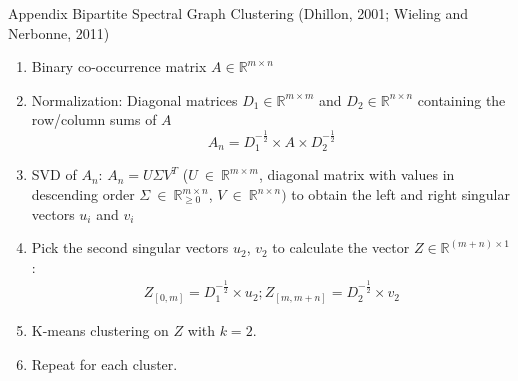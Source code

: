 \documentclass[xcolor={dvipsnames}]{beamer}
\newcommand{\R}{\mathds{R}}
\begin{document}
\begin{frame}{Appendix}
Bipartite Spectral Graph Clustering (Dhillon, 2001; Wieling and Nerbonne, 2011)

\begin{enumerate}
\item Binary co-occurrence matrix 
$A \in \R^{m \times n}$ 
\item Normalization: Diagonal matrices
$D_1  \in \R^{m \times m}$ and $D_2 \in \R^{n \times n}$ containing the row/column sums of $A$
    \begin{equation*}
A_n = D_1^{-\frac{1}{2}} \times A \times D_2^{-\frac{1}{2}}
\end{equation*}
\item
SVD of $A_n$: 
$A_n = U\Sigma{}V^T$
($U~\in~\R^{m \times m}$,
diagonal matrix with values in descending order
$\Sigma{}~\in~\R_{\geq 0}^{m \times n}$,
$V~\in~\R^{n \times n})$
to obtain the left and right singular vectors $u_i$ and $v_i$
\item Pick the second singular vectors $u_2$, $v_2$ to
calculate the vector $Z \in \R^{(m + n) \times 1}$:
\begin{align*}
Z_{[0, m]} = D_1^{-\frac{1}{2}} \times u_2;
Z_{[m, m+n]} = D_2^{-\frac{1}{2}} \times v_2
\end{align*}
\item
K-means clustering on $Z$ with $k = 2$.%
\item
Repeat for each cluster.
\end{enumerate}
\end{frame}
\end{document}
